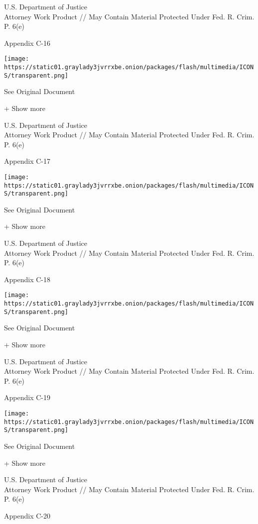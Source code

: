 U.S. Department of Justice\\
Attorney Work Product // May Contain Material Protected Under Fed. R.
Crim. P. 6(e)

Appendix C-16

\protect\hyperlink{}{}

\texttt{[image: https://static01.graylady3jvrrxbe.onion/packages/flash/multimedia/ICONS/transparent.png]}

See Original Document

+ Show more

U.S. Department of Justice\\
Attorney Work Product // May Contain Material Protected Under Fed. R.
Crim. P. 6(e)

Appendix C-17

\protect\hyperlink{}{}

\texttt{[image: https://static01.graylady3jvrrxbe.onion/packages/flash/multimedia/ICONS/transparent.png]}

See Original Document

+ Show more

U.S. Department of Justice\\
Attorney Work Product // May Contain Material Protected Under Fed. R.
Crim. P. 6(e)

Appendix C-18

\protect\hyperlink{}{}

\texttt{[image: https://static01.graylady3jvrrxbe.onion/packages/flash/multimedia/ICONS/transparent.png]}

See Original Document

+ Show more

U.S. Department of Justice\\
Attorney Work Product // May Contain Material Protected Under Fed. R.
Crim. P. 6(e)

Appendix C-19

\protect\hyperlink{}{}

\texttt{[image: https://static01.graylady3jvrrxbe.onion/packages/flash/multimedia/ICONS/transparent.png]}

See Original Document

+ Show more

U.S. Department of Justice\\
Attorney Work Product // May Contain Material Protected Under Fed. R.
Crim. P. 6(e)

Appendix C-20

\protect\hyperlink{}{}

